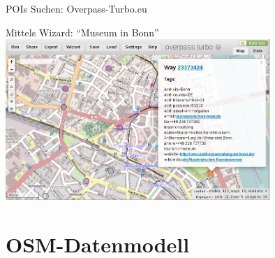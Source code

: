 \documentclass{beamer}
\begin{document}
\begin{frame}{POIs Suchen: Overpass-Turbo.eu}

	Mittels Wizard: "`Museum in Bonn"'
\vfill
 \includegraphics[width=10cm]{overpass.png}

\end{frame}


\section{OSM-Datenmodell}
\end{document}
